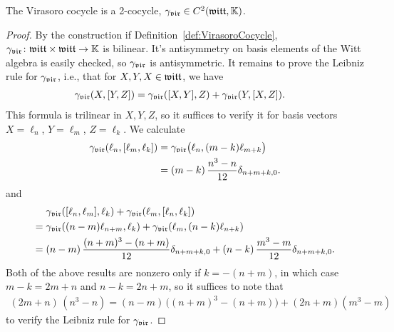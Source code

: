 \begin{lemma}
  \label{lem:VirasoroCocycle_is_TwoCocycle}
  \leanok
  The Virasoro cocycle is a 2-cocycle, ${\gamma}_{\mathfrak{vir}} \in C^2(\mathfrak{witt},\mathbb{K})$.
\end{lemma}
\begin{proof}
  \leanok
  By the construction if Definition~\ref{def:VirasoroCocycle},
  ${\gamma}_{\mathfrak{vir}} \colon \mathfrak{witt} \times \mathfrak{witt} \to \mathbb{K}$ is bilinear.
  It's antisymmetry on basis elements of the Witt algebra is easily checked,
  so ${\gamma}_{\mathfrak{vir}}$ is antisymmetric. It remains to prove the Leibniz
  rule for ${\gamma}_{\mathfrak{vir}}$, i.e., that for $X,Y,X \in \mathfrak{witt}$, we have
  \begin{align}\label{eq:LieTwoCocycle.leibniz}
    {\gamma}_{\mathfrak{vir}}(X,[Y,Z]) = \; & {\gamma}_{\mathfrak{vir}}([X,Y],Z) + {\gamma}_{\mathfrak{vir}}(Y,[X,Z]) .
  \end{align}
  This formula is trilinear in $X,Y,Z$, so it suffices to verify it for basis
  vectors $X=\ell_n$, $Y=\ell_m$, $Z=\ell_k$. We calculate
  \begin{align}
    {\gamma}_{\mathfrak{vir}}(\ell_n , [\ell_m , \ell_k])
    = \; & {\gamma}_{\mathfrak{vir}}\big( \ell_n , (m-k) \ell_{m+k} \big) \\
    = \; & (m-k) \, \frac{n^3 - n}{12} \delta_{n+m+k,0} .
  \end{align}
  and
  \begin{align}
         & {\gamma}_{\mathfrak{vir}}([\ell_n , \ell_m] , \ell_k)
          + {\gamma}_{\mathfrak{vir}}(\ell_m , [\ell_n , \ell_k]) \\
    = \; & {\gamma}_{\mathfrak{vir}}((n-m) \ell_{n+m} , \ell_k)
          + {\gamma}_{\mathfrak{vir}}(\ell_m , (n-k) \ell_{n+k}) \\
    = \; & (n-m) \, \frac{(n+m)^3 - (n+m)}{12} \delta_{n+m+k,0}
          + (n-k) \, \frac{m^3-m}{12} \delta_{n+m+k,0} .
  \end{align}
  Both of the above results are nonzero only if $k=-(n+m)$,
  in which case $m-k = 2m+n$ and $n-k = 2n+m$,
  so it suffices to note that
  \begin{align*}
    (2m+n) \, (n^3 - n)
      = (n-m) \, \big( (n+m)^3 - (n+m) \big)
        + (2 n + m) (m^3 - m)
  \end{align*}
  to verify the Leibniz rule for ${\gamma}_{\mathfrak{vir}}$.
\end{proof}

